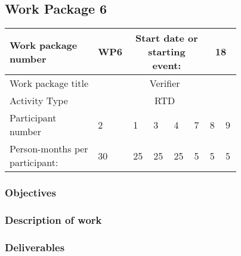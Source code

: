 \subsection{Work Package 6}

\begin{table}[hbpt]\centering
	\begin{tabular}{|p{0.35\linewidth}|p{0.06\linewidth}|p{0.06\linewidth}|p{0.06\linewidth}|
         p{0.06\linewidth}|p{0.06\linewidth}|p{0.06\linewidth}|p{0.06\linewidth}|}\hline
		 Work package number& WP6 &
		 \multicolumn{4}{|c|}{Start date or starting event:}{}&
		 \multicolumn{2}{|c|}{                        18 }{}\\\hline
		 Work package title&\multicolumn{7}{|c|}{ Verifier }{}\\\hline
		 Activity Type&\multicolumn{7}{|c|}{ RTD }{}\\\hline
		 Participant number & 2 & 1 & 3 & 4 & 7 & 8 & 9 \\\hline
		 Person-months per participant: & 30 & 25 & 25 & 25 & 5 & 5 & 5 \\\hline
	\end{tabular}
\end{table}

\subsubsection{Objectives}

\subsubsection{Description of work}

\subsubsection{Deliverables}